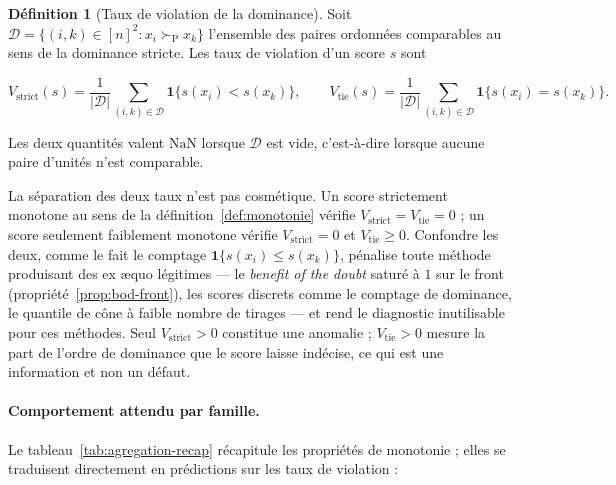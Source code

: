\documentclass[11pt,a4paper]{article}
\theoremstyle{definition}
\newtheorem{definition}{Définition}[section]
\theoremstyle{remark}
\newcommand{\abs}[1]{\left\lvert #1 \right\rvert}
\newcommand{\ind}[1]{\mathbf{1}\{#1\}}
\newcommand{\pareto}{\succ_{\mathrm{P}}}
\begin{document}
\begin{definition}[Taux de violation de la dominance]
  \label{def:violation}
  Soit $\mathcal{D} = \{(i,k) \in [n]^2 : x_i \pareto x_k\}$ l'ensemble des paires
  ordonnées comparables au sens de la dominance stricte. Les taux de violation d'un score
  $s$ sont

  \medskip

  \[
    V_{\mathrm{strict}}(s) = \frac{1}{\abs{\mathcal{D}}}
      \sum_{(i,k)\in\mathcal{D}} \ind{s(x_i) < s(x_k)},
    \qquad
    V_{\mathrm{tie}}(s) = \frac{1}{\abs{\mathcal{D}}}
      \sum_{(i,k)\in\mathcal{D}} \ind{s(x_i) = s(x_k)}.
  \]

  \bigskip

  Les deux quantités valent $\mathrm{NaN}$ lorsque $\mathcal{D}$ est vide, c'est-à-dire
  lorsque aucune paire d'unités n'est comparable.
\end{definition}

\bigskip

La séparation des deux taux n'est pas cosmétique. Un score strictement monotone au sens de
la définition~\ref{def:monotonie} vérifie $V_{\mathrm{strict}} = V_{\mathrm{tie}} = 0$ ; un
score seulement faiblement monotone vérifie $V_{\mathrm{strict}} = 0$ et
$V_{\mathrm{tie}} \ge 0$. Confondre les deux, comme le fait le comptage
$\ind{s(x_i) \le s(x_k)}$, pénalise toute méthode produisant des ex \ae quo légitimes ---
le \emph{benefit of the doubt} saturé à $1$ sur le front (propriété~\ref{prop:bod-front}),
les scores discrets comme le comptage de dominance, le quantile de cône à faible nombre de
tirages --- et rend le diagnostic inutilisable pour ces méthodes. Seul
$V_{\mathrm{strict}} > 0$ constitue une anomalie ; $V_{\mathrm{tie}} > 0$ mesure la part de
l'ordre de dominance que le score laisse indécise, ce qui est une information et non un
défaut.

\bigskip

\paragraph{Comportement attendu par famille.} Le tableau~\ref{tab:agregation-recap}
récapitule les propriétés de monotonie ; elles se traduisent directement en prédictions sur
les taux de violation :

\medskip
\end{document}
